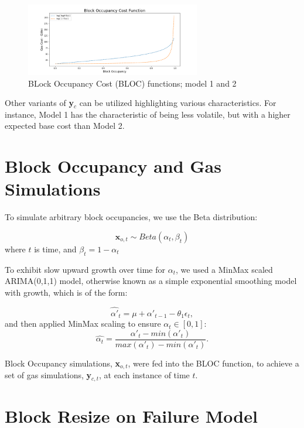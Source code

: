 \documentclass[peerreview]{ieeesyscoin}
\begin{document}
\begin{figure}[h!]
\includegraphics[width=3in]{img/blk_occupancy_cost_fn.png}
\caption{BLock Occupancy Cost (BLOC) functions; model 1 and 2} 
\label{fig:bloc}
\end{figure} 

Other variants of \textbf{y}$_{c}$ can be utilized highlighting various characteristics. For instance, Model 1 has the characteristic of being less volatile, but with a higher expected base cost than Model 2.

\section{Block Occupancy and Gas Simulations}

To simulate arbitrary block occupancies, we use the Beta distribution:

 \begin{equation}
\mathbf{x}_{o,t} \sim Beta(\alpha_{t},\beta_{t})
 \end{equation}
 where $t$ is time, and $\beta_{t} = 1-\alpha_{t}$
 
To exhibit slow upward growth over time for $\alpha_{t}$, we used a MinMax scaled ARIMA(0,1,1) model, otherwise known as a simple exponential smoothing model with growth, which is of the form:

\begin{equation}
\hat{\alpha'}_{t} = \mu + \alpha'_{t-1} - \theta_{1}\epsilon_{t},
\end{equation}
and then applied MinMax scaling to ensure $\alpha_{t} \in [0,1]$:
\begin{equation}
\hat{\alpha_{t}} = \dfrac{\alpha'_{t} - min(\alpha'_{t})}{  max(\alpha'_{t}) - min(\alpha'_{t}) }.
\end{equation}

Block Occupancy simulations, \textbf{x}$_{o,t}$, were fed into the BLOC function, to achieve a set of gas simulations, \textbf{y}$_{c,t}$, at each instance of time $t$.

\section{Block Resize on Failure Model}
\label{appendix:block_resize}
\end{document}
